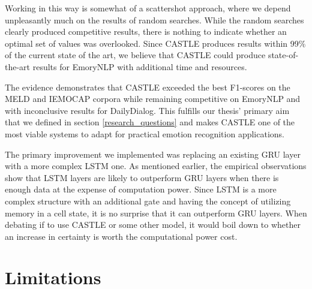 \documentclass[nofilelist]{cslthse-msc}
\begin{document}
Working in this way is somewhat of a scattershot approach, where we depend unpleasantly much on the results of random searches. While the random searches clearly produced competitive results, there is nothing to indicate whether an optimal set of values was overlooked. Since CASTLE produces results within 99$\%$ of the current state of the art, we believe that CASTLE could produce state-of-the-art results for EmoryNLP with additional time and resources. 

The evidence demonstrates that CASTLE exceeded the best F1-scores on the MELD and IEMOCAP corpora while remaining competitive on EmoryNLP and with inconclusive results for DailyDialog. This fulfills our thesis' primary aim that we defined in section \ref{research_questions} and makes CASTLE one of the most viable systems to adapt for practical emotion recognition applications.

The primary improvement we implemented was replacing an existing GRU layer with a more complex LSTM one. As mentioned earlier, the empirical observations show that LSTM layers are likely to outperform GRU layers when there is enough data at the expense of computation power. Since LSTM is a more complex structure with an additional gate and having the concept of utilizing memory in a cell state, it is no surprise that it can outperform GRU layers. When debating if to use CASTLE or some other model, it would boil down to whether an increase in certainty is worth the computational power cost. 









\section{Limitations}
\label{limitations}
\end{document}
